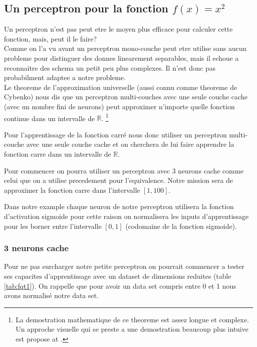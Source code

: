 \documentclass[twoside,openright,a4paper,11pt,french]{article}
\begin{document}
\subsection{Un perceptron pour la fonction $f(x) = x^2$}
Un perceptron n'est pas peut etre le moyen plus efficace pour calculer cette 
fonction, mais, peut il le faire?\\

Comme on l'a vu avant un perceptron mono-couche peut etre utilise sans aucun
probleme pour distinguer des donnes linearement separables, mais il echoue 
a reconnaitre des schema un petit peu plus complexes. Il n'est donc pas 
probabilment adaptee a notre probleme.\\

Le theoreme de l'approximation universelle (aussi connu comme theoreme de Cybenko) 
nous dis que un perceptron multi-couches avec une seule couche cache (avec un nombre
fini de neurons) peut approximer n'importe quelle fonction continue dans un 
intervalle de $\mathbb{R}$.
\footnote{
La demostration mathematique de ce theoreme est assez longue et complexe. Un approche visuelle
qui se preste a une demostration beaucoup plus intuive est propose at \cite{visuniprof}.
}
\cite{cybthm}

Pour l'apprentissage de la fonction carré nous donc utiliser un perceptron
multi-couche avec une seule couche cache et on cherchera de lui faire apprendre
la fonction carre dans un intervalle de $\mathbb{R}$.

Pour commencer on pourra utiliser un perceptron avec 3 neurons cache comme
celui que on a utilise precedement pour l'equivalence. Notre mission sera de
approximer la fonction carre dans l'intervalle $[1,100]$.

Dans notre example chaque neuron de notre perceptron utilisera la fonction
d'activation sigmoide pour cette raison on normalisera les inputs
d'apprentissage pour les borner entre l'intervalle $[0,1]$ (codomaine de la
fonction sigmoide).

\subsubsection{3 neurons cache}

Pour ne pas surcharger notre petite perceptron on pourrait commencer a tester
ses capacites d'apprentissage avec un dataset de dimensions reduites (table
\ref{tab:fqt1}). On rappelle que pour avoir un data set compris entre 0 et 1
nous avons normalisé notre data set.
\end{document}
